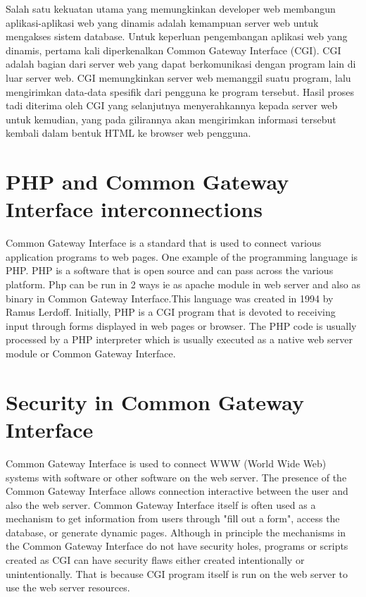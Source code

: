 \par Salah satu kekuatan utama yang memungkinkan developer web membangun aplikasi-aplikasi web yang dinamis adalah kemampuan server web untuk mengakses sistem database. Untuk keperluan pengembangan aplikasi web yang dinamis, pertama kali diperkenalkan Common Gateway Interface (CGI). CGI adalah bagian dari server web yang dapat berkomunikasi dengan program lain di luar server web. CGI memungkinkan server web memanggil suatu program, lalu mengirimkan data-data spesifik dari pengguna ke program tersebut. Hasil proses tadi diterima oleh CGI yang selanjutnya menyerahkannya kepada server web untuk kemudian, yang pada gilirannya akan mengirimkan informasi tersebut kembali dalam bentuk HTML ke browser web pengguna\cite{ibrahim2011sistem}.

\section{PHP and Common Gateway Interface interconnections }
Common Gateway Interface is a standard that is used to connect various application programs to web pages. One example of the programming language is PHP. PHP is a software that is open source and can pass across the various platform. Php can be run in 2 ways ie as apache module in web server and also as binary in Common Gateway Interface.This language was created in 1994 by Ramus Lerdoff.  Initially, PHP is a CGI program that is devoted to receiving input through forms displayed in web pages or browser. The PHP code is usually processed by a PHP interpreter which is usually executed as a native web server module or Common Gateway Interface\cite{nahado2015bumbu}.


\section{Security in Common Gateway Interface }
Common Gateway Interface is used to connect WWW (World Wide Web) systems with software or other software on the web server. The presence of the Common Gateway Interface allows connection interactive between the user and also the web server. Common Gateway Interface itself is often used as a mechanism to get information from users through "fill out a form", access the database, or generate dynamic pages. Although in principle the mechanisms in the Common Gateway Interface do not have security holes, programs or scripts created as CGI can have security flaws either created intentionally or unintentionally. That is because CGI program itself is run on the web server to use the web server resources.


